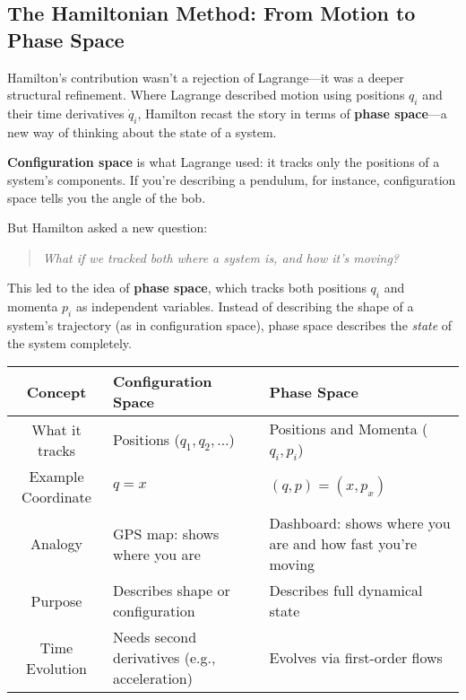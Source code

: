   
  
  \subsection{The Hamiltonian Method: From Motion to Phase Space}

  Hamilton’s contribution wasn’t a rejection of Lagrange—it was a deeper structural refinement. Where Lagrange described motion using positions \( q_i \) and their time derivatives \( \dot{q}_i \), Hamilton recast the story in terms of \textbf{phase space}—a new way of thinking about the state of a system.
  
  \textbf{Configuration space} is what Lagrange used: it tracks only the positions of a system’s components. If you’re describing a pendulum, for instance, configuration space tells you the angle of the bob.
  
  But Hamilton asked a new question:
  \begin{quote}
      \textit{What if we tracked both where a system is, and how it's moving?}
  \end{quote}
  
  This led to the idea of \textbf{phase space}, which tracks both positions \( q_i \) and momenta \( p_i \) as independent variables. Instead of describing the shape of a system’s trajectory (as in configuration space), phase space describes the \textit{state} of the system completely.
  
  \begin{center}
    \begin{tabularx}{\textwidth}{|c|X|X|}
    \hline
    \textbf{Concept} & \textbf{Configuration Space} & \textbf{Phase Space} \\
    \hline
    What it tracks & Positions (\( q_1, q_2, \dots \)) & Positions and Momenta (\( q_i, p_i \)) \\
    \hline
    Example Coordinate & \( q = x \) & \( (q, p) = (x, p_x) \) \\
    \hline
    Analogy & GPS map: shows where you are & Dashboard: shows where you are and how fast you're moving \\
    \hline
    Purpose & Describes shape or configuration & Describes full dynamical state \\
    \hline
    Time Evolution & Needs second derivatives (e.g., acceleration) & Evolves via first-order flows \\
    \hline
    \end{tabularx}
    \end{center}
    

